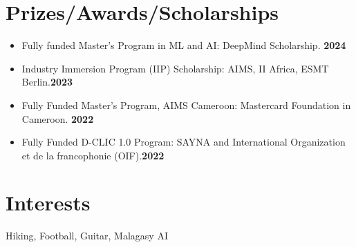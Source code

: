 \documentclass[a4paper,9pt]{article}
\newlength{\lfonts}
\begin{document}
\section{Prizes/Awards/Scholarships}
\begin{itemize}
	\item[\faTrophy] Fully funded Master's Program in ML and AI: DeepMind Scholarship. \hfill \textbf{\color{emphasis}2024}
	\item[\faTrophy] Industry Immersion Program (IIP) Scholarship: AIMS, II Africa, ESMT Berlin.\hfill \textbf{\color{emphasis}2023}
	\item[\faTrophy] Fully Funded Master's Program, AIMS Cameroon: Mastercard Foundation in Cameroon. \hfill \textbf{\color{emphasis}2022}
	\item[\faTrophy] Fully Funded D-CLIC 1.0 Program: SAYNA and International Organization et de la francophonie (OIF).\hfill \textbf{\color{emphasis}2022}
\end{itemize}
\section{Interests}
\makebox[2.5\lfonts][r]{\faFootballBall ~~}\parbox{\linewidth}{ Hiking, Football, Guitar, Malagasy AI}
\end{document}
